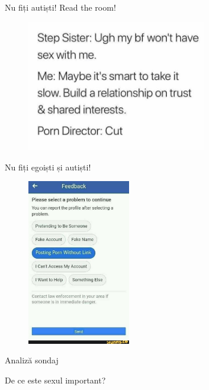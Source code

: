 \documentclass{simple}
\begin{document}
\begin{frame}{Nu fiți autiști! Read the room!}
  \pause
  \begin{figure}
    \centering
    \includegraphics[width=0.7\textwidth]{img/porn-director.png}
  \end{figure}
\end{frame}

\begin{frame}{Nu fiți egoiști și autiști!}
  \pause
  \begin{figure}
    \centering
    \includegraphics[width=0.4\textwidth]{img/feedback-porn-without-link.jpg}
  \end{figure}
\end{frame}

\begin{frame}{}
  \centering
  \LARGE
  Analiză sondaj
\end{frame}

\begin{frame}{}
  \centering
  \LARGE
  De ce este sexul important?
\end{frame}
\end{document}
